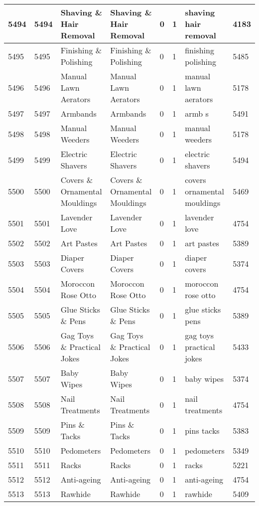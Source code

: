 \begin{longtable}{|l|l|l|l|l|l|l|l|}
5494 & 5494 & Shaving \& Hair Removal & Shaving \& Hair Removal & 0 & 1 & shaving hair removal & 4183 \\ \hline 
5495 & 5495 & Finishing \& Polishing & Finishing \& Polishing & 0 & 1 & finishing polishing & 5485 \\ \hline 
5496 & 5496 & Manual Lawn Aerators & Manual Lawn Aerators & 0 & 1 & manual lawn aerators & 5178 \\ \hline 
5497 & 5497 & Armbands & Armbands & 0 & 1 & armb s & 5491 \\ \hline 
5498 & 5498 & Manual Weeders & Manual Weeders & 0 & 1 & manual weeders & 5178 \\ \hline 
5499 & 5499 & Electric Shavers & Electric Shavers & 0 & 1 & electric shavers & 5494 \\ \hline 
5500 & 5500 & Covers \& Ornamental Mouldings & Covers \& Ornamental Mouldings & 0 & 1 & covers ornamental mouldings & 5469 \\ \hline 
5501 & 5501 & Lavender Love & Lavender Love & 0 & 1 & lavender love & 4754 \\ \hline 
5502 & 5502 & Art Pastes & Art Pastes & 0 & 1 & art pastes & 5389 \\ \hline 
5503 & 5503 & Diaper Covers & Diaper Covers & 0 & 1 & diaper covers & 5374 \\ \hline 
5504 & 5504 & Moroccon Rose Otto & Moroccon Rose Otto & 0 & 1 & moroccon rose otto & 4754 \\ \hline 
5505 & 5505 & Glue Sticks \& Pens & Glue Sticks \& Pens & 0 & 1 & glue sticks pens & 5389 \\ \hline 
5506 & 5506 & Gag Toys \& Practical Jokes & Gag Toys \& Practical Jokes & 0 & 1 & gag toys practical jokes & 5433 \\ \hline 
5507 & 5507 & Baby Wipes & Baby Wipes & 0 & 1 & baby wipes & 5374 \\ \hline 
5508 & 5508 & Nail Treatments & Nail Treatments & 0 & 1 & nail treatments & 4754 \\ \hline 
5509 & 5509 & Pins \& Tacks & Pins \& Tacks & 0 & 1 & pins tacks & 5383 \\ \hline 
5510 & 5510 & Pedometers & Pedometers & 0 & 1 & pedometers & 5349 \\ \hline 
5511 & 5511 & Racks & Racks & 0 & 1 & racks & 5221 \\ \hline 
5512 & 5512 & Anti-ageing & Anti-ageing & 0 & 1 & anti-ageing & 4754 \\ \hline 
5513 & 5513 & Rawhide & Rawhide & 0 & 1 & rawhide & 5409 \\ \hline 

\end{longtable}
